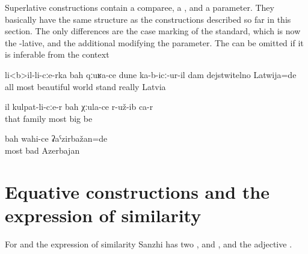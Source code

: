 Superlative constructions contain a comparee, a , and a parameter. They basically have the same structure as the constructions described so far in this section. The only differences are the case marking of the standard, which is now the -lative, and the additional  modifying the parameter. The  can be omitted if it is inferable from the context
%
\begin{exe}
	\ex	\label{ex:‎‎‎Among all as the most beautiful (country) seemed to me Latvia}
	\gll	li<b>il-li-cːe-rka	bah	qːuʁa-ce	dune	ka-b-icː-ur-il	dam	dejstwitelno	Latwija=de	\\
		all	most	beautiful	world	stand		really	Latvia	\\
	\glt	{}

	\ex	\label{ex:‎‎‎She was the oldest within her family.}
	\gll	il	kulpat-li-cːe-r	bah	χːula-ce	r-už-ib	ca-r\\
		that	family	most	big	be	\\
	\glt	{}

	\ex	\label{ex:‎‎‎The worst (place) was Azerbajan}
	\gll	bah	wahi-ce	ʡaˁzirbažan=de\\
		most	bad	Azerbajan\\
	\glt	{}
\end{exe}



\section{Equative constructions and the expression of similarity}
\label{sec:Equative constructions and the expression of similarity}

For  and the expression of similarity Sanzhi has two ,  and  , and the adjective  .

